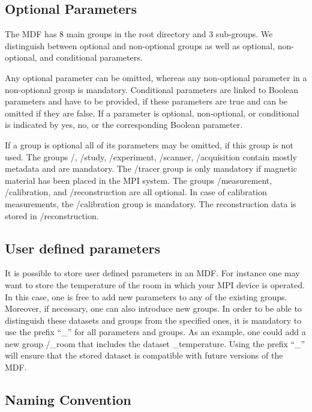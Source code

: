 \documentclass[landscape,a4paper]{article} %
\newcommand{\inlvar}[1]{{\ttfamily#1}}
\begin{document}
\begin{multicols}{2}
\subsection{Optional Parameters}

The MDF has 8 main groups in the root directory and 3 sub-groups. We distinguish between optional and non-optional groups as well as optional, non-optional, and conditional parameters. 

Any optional parameter can be omitted, whereas any non-optional parameter in a non-optional group is mandatory. Conditional parameters are linked to Boolean parameters and have to be provided, if these parameters are true and can be omitted if they are false. If a parameter is optional, non-optional, or conditional is indicated by yes, no, or the corresponding Boolean parameter.

If a group is optional all of its parameters may be omitted, if this group is not used. The groups \inlvar{/}, \inlvar{/study}, \inlvar{/experiment}, \inlvar{/scanner}, \inlvar{/acquisition} contain mostly metadata and are mandatory. The \inlvar{/tracer} group is only mandatory if magnetic material has been placed in the MPI system. The groups \inlvar{/measurement}, \inlvar{/calibration}, and \inlvar{/reconstruction} are all optional. In case of calibration measurements, the \inlvar{/calibration} group is mandatory. The reconstruction data is stored in \inlvar{/reconstruction}. 

\subsection{User defined parameters}

It is possible to store user defined parameters in an MDF. For instance one may want to store the temperature of the room in which your MPI device is operated. In this case, one is free to add new parameters to any of the existing groups. Moreover, if necessary, one can also introduce new groups. In order to be able to distinguish these datasets and groups from the specified ones, it is mandatory to use the prefix ``\inlvar{\_}'' for all parameters and groups. As an example, one could add a new group \inlvar{/\_room} that includes the dataset \inlvar{\_temperature}. Using the prefix ``\inlvar{\_}'' will ensure that the stored dataset is compatible with future versions of the MDF.

\subsection{Naming Convention}


\end{multicols}
\end{document}
